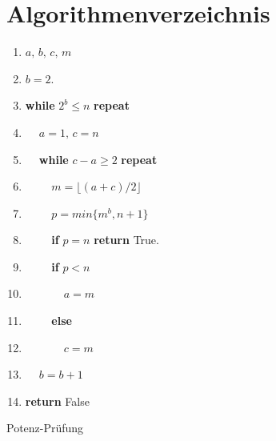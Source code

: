 \documentclass[12pt,oneside]{article}
\theoremstyle{remark}
\theoremstyle{definition}
\begin{document}
\clearpage
\appendix
\section{Algorithmenverzeichnis}
\begin{algorithm}[H]
\SetAlgoLined
{}
\begin{enumerate}
\item $a, \, b, \, c, \, m$

\item $ b = 2$.

\item \textbf{while} $2^b \leq n$ \textbf{repeat}

\item $\: \: \: \: $ $a = 1, \, c = n $

\item $\: \: \: \: $ \textbf{while} $c - a \geq 2$ \textbf{repeat}

\item $\: \: \: \: \: \: \: \: \:$ $ m = \lfloor (a + c)/2 \rfloor$

\item $\: \: \: \: \: \: \: \: \:$ $ p = min\{m^b,n+1\}$

\item $\: \: \: \: \: \: \: \: \:$ \textbf{if} $ p = n$ \textbf{return} True.

\item $\: \: \: \: \: \: \: \: \:$ \textbf{if} $p < n$

\item $\: \: \: \: \: \: \: \: \: \: \: \: \: \:$  $ a = m$

\item $\: \: \: \: \: \: \: \: \:$ \textbf{else}

\item $\: \: \: \: \: \: \: \: \: \: \: \: \: \:$  $c = m$

\item $\: \: \: \: $ $b = b + 1$

\item \textbf{return} False


\end{enumerate}
\caption{Potenz-Prüfung}
\label{appendix:potenz}
\end{algorithm}
\end{document}
